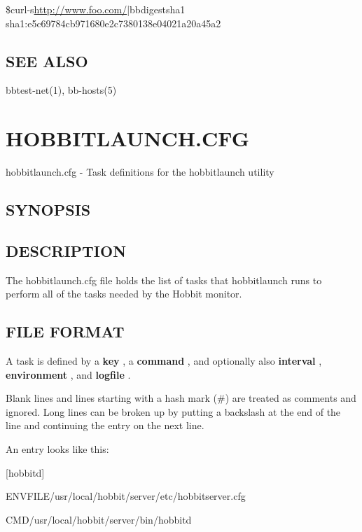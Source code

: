 \$curl-s\url{http://www.foo.com/}|bbdigestsha1  sha1:e5c69784cb971680e2c7380138e04021a20a45a2 

 
\subsection{SEE ALSO}
bbtest-net(1), bb-hosts(5) 

 


%
\newpage
\section{HOBBITLAUNCH.CFG}

 hobbitlaunch.cfg - Task definitions for the hobbitlaunch utility 

 
\subsection{SYNOPSIS}
\textbf{}


 
\subsection{DESCRIPTION}
 The hobbitlaunch.cfg file holds the list of tasks that hobbitlaunch
 runs to perform all of the tasks needed by the Hobbit monitor. 


 
\subsection{FILE FORMAT}
 A task is defined by a \textbf{key}
, a \textbf{command}
, and optionally also \textbf{interval}
, \textbf{environment}
, and \textbf{logfile}
. 

  Blank lines and lines starting with a hash mark (\#) are treated as
  comments and ignored. Long lines can be broken up by putting a
  backslash at the end of the line and continuing the entry on the
  next line. 



  An entry looks like this: 


  
[hobbitd]  
 
ENVFILE/usr/local/hobbit/server/etc/hobbitserver.cfg  
 
CMD/usr/local/hobbit/server/bin/hobbitd 


